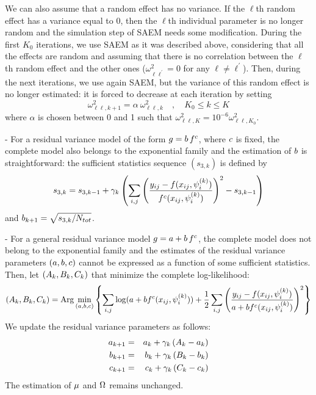 We can also assume that a random effect has no variance. If the $\ell$th random effect has a variance equal to 0, then the $\ell$th individual parameter is
no longer random and the simulation step of SAEM needs some modification. During the first $K_0$ iterations, we use SAEM as it was described above,
considering that all the effects are random and assuming that there is no correlation between the $\ell$th random effect and the other ones
($\omega^2_{\ell \ell^\prime}=0$ for any $\ell \neq \ell^\prime$). Then, during the next iterations, we use again SAEM, but the variance of this random effect is no longer
estimated: it is forced to decrease at each iteration by setting
\begin{equation}
\omega^2_{\ell\ell,k+1}= \alpha \ {\omega^2_{\ell\ell,k}} \quad , \quad K_0 \leq k \leq K
\end{equation}
where $\alpha$ is chosen between 0 and 1 such that $\omega^2_{\ell\ell,K}= 10^{-6}\omega^2_{\ell\ell,K_0}$.

 - For a  residual variance model of the form $g=  b \, f^c$, where
$c$ is fixed, the complete model also belongs to the exponential family and the estimation of
$b$ is straightforward:  the sufficient statistics sequence $(s_{3,k})$ is defined by
$$ s_{3,k} =  s_{3,k-1}  + \gamma_k \left(
\sum_{i,j} \left( \frac{y_{ij} - f(x_{ij},{\psi_i^{(k)}})}{f^c (x_{ij},{\psi_i^{(k)}})}  \right) ^2  - s_{3,k-1}
\right) $$ and $b_{k+1} =  \sqrt{ s_{3,k}/ N_{tot} }$.

- For a general residual variance model $g= a + b \, f^c$, the complete model does not belong
to the exponential family and the estimates of the residual variance parameters $(a,b,c)$
cannot be expressed as a function of some sufficient statistics. Then, let $(A_k,B_k,C_k)$
that minimize the complete log-likelihood:
$$(A_k, B_k,C_k) = {\rm Arg}\min_{(a,b,c)}
\left\{ \sum_{i,j}\log( a + b f^{c}(x_{ij},{\psi_i^{(k)}}) ) +\frac{1}{2} \sum_{i,j}\left(
\frac{y_{ij} - f(x_{ij},{\psi_i^{(k)}})}{a + b f^{c}(x_{ij},{\psi_i^{(k)}}) } \right)^2 \right\}
$$
We update the residual variance parameters as follows:
 \begin{eqnarray}
a_{k+1} & = & a_{k} +  \gamma_k \left(  A_k - a_{k}  \right)   \\
b_{k+1} & = & b_{k} +  \gamma_k \left(  B_k - b_{k}  \right)   \\
c_{k+1} & = & c_{k} +  \gamma_k \left(  C_k - c_{k}  \right)
\end{eqnarray}
The estimation of $\fixed_effect$ and ${\Omega}$ remains unchanged.


